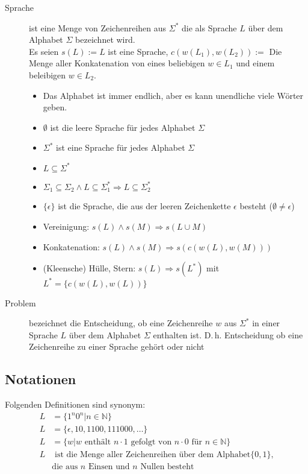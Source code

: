 \begin{description}
	\item [Sprache] 
	ist eine Menge von Zeichenreihen aus $\Sigma^*$ die als Sprache $L$ über dem Alphabet $\Sigma$ bezeichnet wird.\\
	Es seien $s(L) := L$ ist eine Sprache, $c(w(L_1), w(L_2)) := $ Die Menge aller Konkatenation von eines beliebigen $w \in L_1$ und einem beleibigen $w \in L_2$.
	\begin{itemize}\itemsep0em
		\item Das Alphabet ist immer endlich, aber es kann unendliche viele Wörter geben.
		\item $\emptyset$ ist die leere Sprache für jedes Alphabet $\Sigma$
		\item $\Sigma^*$ ist eine Sprache für jedes Alphabet $\Sigma$
		\item $L \subseteq \Sigma^*$
		\item $\Sigma_1 \subseteq \Sigma_2 \wedge L \subseteq \Sigma_1^* \Rightarrow L \subseteq \Sigma_2^*$
		\item $\{\epsilon\}$ ist die Sprache, die aus der leeren Zeichenkette $\epsilon$ besteht ($\emptyset \neq \epsilon$)
		\item Vereinigung: $s(L) \wedge s(M) \Rightarrow s(L \cup M)$
		\item Konkatenation: $s(L) \wedge s(M) \Rightarrow s(c(w(L), w(M)))$
		\item (Kleensche) Hülle, Stern: $s(L) \Rightarrow s(L^*)$ mit $L^* = \{c(w(L), w(L))\}$
	\end{itemize}
	\item[Problem] 
	bezeichnet die Entscheidung, ob eine Zeichenreihe $w$ aus $\Sigma^*$ in einer Sprache $L$ über dem Alphabet $\Sigma$ enthalten ist. D.\,h. Entscheidung ob eine Zeichenreihe zu einer Sprache gehört oder nicht

\end{description}

\subsection{Notationen}
Folgenden Definitionen sind synonym:
\begin{align*}
L& = \{1^n0^n | n \in \mathbb{N}\}\\
L& = \{\epsilon, 10, 1100, 111000, \dots\}\\
L& = \{w | w \mbox{ enthält } n \cdot 1 \mbox{ gefolgt von } n \cdot 0 \mbox{ für } n \in \mathbb{N}\}\\
L& \mbox{ ist die Menge aller Zeichenreihen über dem Alphabet} \{0, 1\}\mbox{,}\\
&\mbox{die aus }n\mbox{ Einsen und }n\mbox{ Nullen besteht}
\end{align*}

